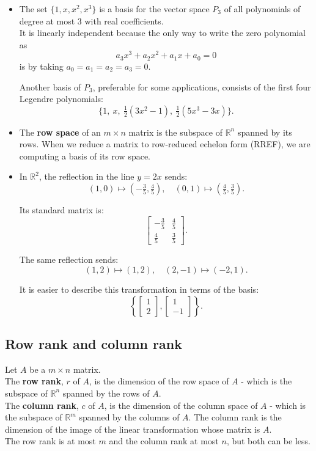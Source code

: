 \documentclass[a4paper, 9pt]{extarticle}
\begin{document}
\begin{itemize}
  \item The set $\{1, x, x^2, x^3\}$ is a basis for the vector space $P_3$ of all polynomials of degree at most 3 with real coefficients.\\

        It is linearly independent because the only way to write the zero polynomial as
        $$
          a_3 x^3 + a_2 x^2 + a_1 x + a_0 = 0
        $$
        is by taking $a_0 = a_1 = a_2 = a_3 = 0$.

        Another basis of $P_3$, preferable for some applications, consists of the first four Legendre polynomials:
        $$
          \{1,\ x,\ \tfrac{1}{2}(3x^2 - 1),\ \tfrac{1}{2}(5x^3 - 3x)\}.
        $$
  \item The \textbf{row space} of an $m \times n$ matrix is the subspace of $\mathbb{R}^n$ spanned by its rows. When we reduce a matrix to row-reduced echelon form (RREF), we are computing a basis of its row space.
  \item In $\mathbb{R}^2$, the reflection in the line $y = 2x$ sends:
        \[
          (1,0) \mapsto \left(-\tfrac{3}{5}, \tfrac{4}{5}\right), \quad
          (0,1) \mapsto \left(\tfrac{4}{5}, \tfrac{3}{5}\right).
        \]

        Its standard matrix is:
        \[
          \begin{bmatrix}
            - \tfrac{3}{5} & \tfrac{4}{5} \\
            \tfrac{4}{5}   & \tfrac{3}{5}
          \end{bmatrix}.
        \]

        The same reflection sends:
        \[
          (1,2) \mapsto (1,2), \quad
          (2, -1) \mapsto (-2,1).
        \]

        It is easier to describe this transformation in terms of the basis:
        \[
          \left\{
          \begin{bmatrix}
            1 \\ 2
          \end{bmatrix},
          \begin{bmatrix}
            1 \\ -1
          \end{bmatrix}
          \right\}.
        \]
\end{itemize}

\subsection{Row rank and column rank}
Let $A$ be a $m \times n$ matrix. \\[2ex]
The \textbf{row rank}, $r$ of $A$, is the dimension of the row space of $A$ - which is the subspace of $\mathbb{R}^n$ spanned by the rows of $A$. \\[2ex]
The \textbf{column rank}, $c$ of $A$, is the dimension of the column space of $A$ - which is the subspace of $\mathbb{R}^m$ spanned by the columns of $A$. The column rank is the dimension of the image of the linear transformation whose matrix is $A$. \\[2ex]
The row rank is at most $m$ and the column rank at most $n$, but both can be less.
\end{document}
